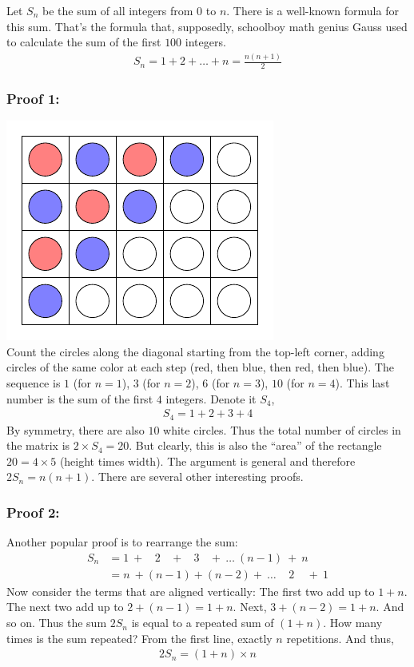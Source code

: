 \documentclass[12pt]{article}
\newenvironment{answer}{\vspace{1em}\color{blue!90!black}}{}
\newenvironment{answer}{\vspace{0em}\expandafter\comment}{\expandafter\endcomment}
\begin{document}
\begin{answer}
Let $S_{n}$ be the sum of all integers from $0$ to $n$. There is a well-known formula for this sum. That's the formula that, supposedly, schoolboy math genius Gauss used to calculate the sum of the first $100$ integers. 
\begin{align*}
S_{n} = 1 + 2 + \ldots + n
= \frac{n(n+1)}{2}
\end{align*}
\subsubsection*{Proof 1:}
\includegraphics{tikz-matrix-nodes-circles-2}\bigskip\\
Count the circles along the diagonal starting from the top-left corner, adding circles of the same color at each step (red, then blue, then red, then blue). The sequence is $1$ (for $n=1$), $3$ (for $n=2$), $6$ (for $n=3$), $10$ (for $n=4$). This last number is the sum of the first $4$ integers. Denote it $S_{4}$,
\begin{align*}
S_{4} = 1 + 2 + 3 + 4
\end{align*}
By symmetry, there are also $10$ white circles. Thus the total number of circles in the matrix is $2 \times S_{4} = 20$. But clearly, this is also the ``area'' of the rectangle $20=4\times5$ (height times width). The argument is general and therefore $2 S_{n} = n(n+1)$. There are several other interesting proofs. 

\subsubsection*{Proof 2:}
Another popular proof is to rearrange the sum:
\begin{align*}
S_{n} & = 1 ~+~~~~2 ~~~~+~~~~3 ~~~~+~\ldots~ (n-1) ~+~ n \\
      & = n ~+ (n-1) + (n-2) + ~\ldots~~~~~ 2 ~~~~~ + ~ 1
\end{align*}
Now consider the terms that are aligned vertically: The first two add up to $1+n$. The next two add up to $2+(n-1)=1+n$. Next, $3+(n-2)=1+n$. And so on. Thus the sum $2S_{n}$ is equal to a repeated sum of  $(1+n)$. How many times is the sum repeated? From the first line, exactly $n$ repetitions. And thus,
\begin{align*}
2 S_{n} = (1+n) \times n
\end{align*}

\end{answer}
\end{document}
